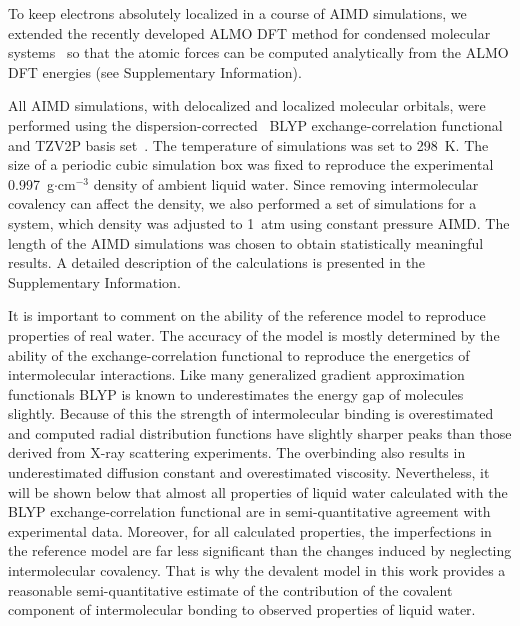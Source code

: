 \documentclass[aps,prl,reprint,amsmath,amssymb]{revtex4-1}
\begin{document}
To keep electrons absolutely localized in a course of AIMD simulations, we extended the recently developed ALMO DFT method for  condensed molecular systems~\cite{Khaliullin2013JCTC} so that the atomic forces can be computed analytically from the ALMO DFT energies (see Supplementary Information).

All AIMD simulations, with delocalized and localized molecular orbitals, were performed using the dispersion-corrected~\cite{grimme2010consistent} BLYP exchange-correlation functional~\cite{becke1988density, RZK-LYP} and TZV2P basis set~\cite{vandevondele2007gaussian}. 
The temperature of simulations was set to 298~K. 
The size of a periodic cubic simulation box was fixed to reproduce the experimental 0.997~g$\cdot$cm$^{-3}$ density of ambient liquid water. 
Since removing intermolecular covalency can affect the density, we also performed a set of simulations for a system, which density was adjusted to 1~atm using constant pressure AIMD. 
The length of the AIMD simulations was chosen to obtain statistically meaningful results. 
A detailed description of the calculations is presented in the Supplementary Information.

It is important to comment on the ability of the reference model to reproduce properties of real water. 
The accuracy of the model is mostly determined by the ability of the exchange-correlation functional to reproduce the energetics of intermolecular interactions. Like many generalized gradient approximation functionals BLYP is known to underestimates the energy gap of molecules slightly. 
Because of this the strength of intermolecular binding is overestimated and computed radial distribution functions have slightly sharper peaks than those derived from X-ray scattering experiments. 
The overbinding also results in underestimated diffusion constant and overestimated viscosity. 
Nevertheless, it will be shown below that almost all properties of liquid water calculated with the BLYP exchange-correlation functional are in semi-quantitative agreement with experimental data. 
Moreover, for all calculated properties, the imperfections in the reference model are far less significant than the changes induced by neglecting intermolecular covalency. 
That is why the devalent model in this work provides a reasonable semi-quantitative estimate of the contribution of the covalent component of intermolecular bonding to observed properties of liquid water.
\end{document}
